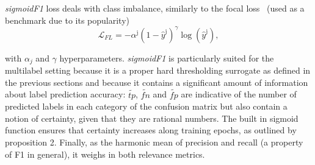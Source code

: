 \emph{sigmoidF1} loss deals with class imbalance, similarly to the focal loss~\cite{focalLoss} (used as a benchmark due to its popularity)
\begin{equation}
  \mathcal{L}_{FL} = -\alpha^{\mathrm{j}}\left(1-\hat{y}^{\mathrm{j}}\right)^{\gamma} \log \left(\hat{y}^{\mathrm{j}}\right),
\end{equation}

with $\alpha_j$ and $\gamma$ hyperparameters. \emph{sigmoidF1} is particularly suited for the multilabel setting because it is a proper hard thresholding surrogate as defined in the previous sections and because it contains a significant amount of information about label prediction accuracy: $\widetilde{\mathit{tp}}$, $\widetilde{\mathit{fn}}$ and $\widetilde{\mathit{fp}}$ are indicative of the number of predicted labels in each category of the confusion matrix but also contain a notion of certainty, given that they are rational numbers. The built in sigmoid function ensures that certainty increases along training epochs, as outlined by proposition 2. Finally, as the harmonic mean of precision and recall (a property of F1 in general), it weighs in both relevance metrics.











